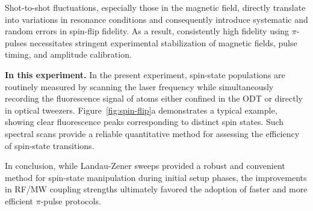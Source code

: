 Shot-to-shot fluctuations, especially those in the magnetic field, directly translate into variations in resonance conditions and consequently introduce systematic and random errors in spin-flip fidelity. As a result, consistently high fidelity using $\pi$-pulses necessitates stringent experimental stabilization of magnetic fields, pulse timing, and amplitude calibration.


\textbf{In this experiment.}
In the present experiment, spin-state populations are routinely measured by scanning the laser frequency while simultaneously recording the fluorescence signal of atoms either confined in the ODT or directly in optical tweezers. Figure~\ref{fig:spin-flip}a demonstrates a typical example, showing clear fluorescence peaks corresponding to distinct spin states. Such spectral scans provide a reliable quantitative method for assessing the efficiency of spin-state transitions.

In conclusion, while Landau-Zener sweeps provided a robust and convenient method for spin-state manipulation during initial setup phases, the improvements in RF/MW coupling strengths ultimately favored the adoption of faster and more efficient $\pi$-pulse protocols.